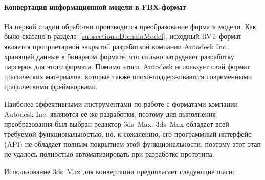 ﻿\paragraph{Конвертация информационной модели в FBX-формат}

На первой стадии обработки производится преобразование формата модели.
Как было сказано в разделе~\ref{subsections:DomainModel},
исходный RVT-формат является проприетарной закрытой разработкой
компании Autodesk Inc., хранящей данные в бинарном формате,
что сильно затрудняет разработку парсеров для этого формата.
Помимо этого, Autodesk использует свой формат графических материалов,
которые также плохо-поддерживаются современными графическими фреймворками.

Наиболее эффективными инструментами по работе с форматами
ком\-па\-нии Auto\-desk Inc. являются её же разработки,
поэтому для выполнения преобразования был выбран редактор 3ds~Max.
3ds~Max обладает всей требуемой функциональностью, но, к сожалению,
его программный интерфейс (API) не обладает полным покрытием этой функциональности,
поэтому этот этап не удалось полностью автоматизировать при разработке прототипа.

Использование 3ds~Max для конвертации предполагает следующие шаги:

